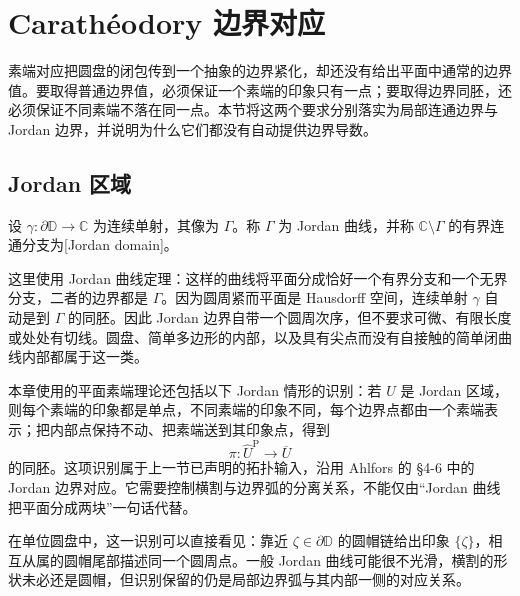 \section{Carathéodory 边界对应}
\label{b3:sec:0702}

素端对应把圆盘的闭包传到一个抽象的边界紧化，却还没有给出平面中通常的边界值。要取得普通边界值，必须保证一个素端的印象只有一点；要取得边界同胚，还必须保证不同素端不落在同一点。本节将这两个要求分别落实为局部连通边界与 Jordan 边界，并说明为什么它们都没有自动提供边界导数。

\subsection{Jordan 区域}
\label{b3:subsec:070201}

\begin{definition}\label{b3:def:07-jordan-domain}
设 \(\gamma:\partial\mathbb D\to\mathbb C\) 为连续单射，其像为 \(\Gamma\)。称 \(\Gamma\) 为 Jordan 曲线，并称 \(\mathbb C\setminus\Gamma\) 的有界连通分支为[Jordan domain]。
\end{definition}

这里使用 Jordan 曲线定理：这样的曲线将平面分成恰好一个有界分支和一个无界分支，二者的边界都是 \(\Gamma\)。因为圆周紧而平面是 Hausdorff 空间，连续单射 \(\gamma\) 自动是到 \(\Gamma\) 的同胚。因此 Jordan 边界自带一个圆周次序，但不要求可微、有限长度或处处有切线。圆盘、简单多边形的内部，以及具有尖点而没有自接触的简单闭曲线内部都属于这一类。

\ProseParagraphBreak

本章使用的平面素端理论还包括以下 Jordan 情形的识别：若 \(U\) 是 Jordan 区域，则每个素端的印象都是单点，不同素端的印象不同，每个边界点都由一个素端表示；把内部点保持不动、把素端送到其印象点，得到
\[
 \pi:\widehat U^{\mathrm P}\longrightarrow\overline U
\]
的同胚。这项识别属于上一节已声明的拓扑输入，沿用 Ahlfors 的 \S4-6 中的 Jordan 边界对应\cite[pp. 57--60]{Ahlfors2010Conformal}。它需要控制横割与边界弧的分离关系，不能仅由“Jordan 曲线把平面分成两块”一句话代替。

\ProseParagraphBreak

在单位圆盘中，这一识别可以直接看见：靠近 \(\zeta\in\partial\mathbb D\) 的圆帽链给出印象 \(\{\zeta\}\)，相互从属的圆帽尾部描述同一个圆周点。一般 Jordan 曲线可能很不光滑，横割的形状未必还是圆帽，但识别保留的仍是局部边界弧与其内部一侧的对应关系。

\ProseParagraphBreak

